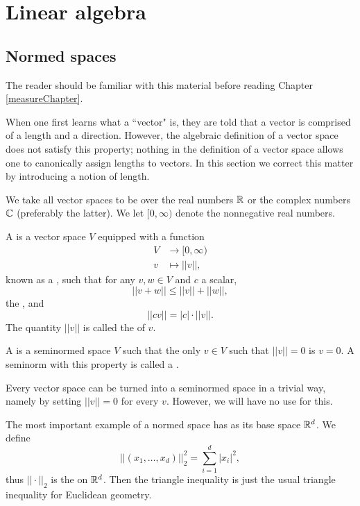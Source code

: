 \appendix
\chapter{Linear algebra}
\section{Normed spaces}
The reader should be familiar with this material before reading Chapter \ref{measureChapter}.

When one first learns what a ``vector" is, they are told that a vector is comprised of a length and a direction.
However, the algebraic definition of a vector space does not satisfy this property; nothing in the definition of a vector space allows one to canonically assign lengths to vectors.
In this section we correct this matter by introducing a notion of length.

We take all vector spaces to be over the real numbers $\mathbb{R}$ or the complex numbers $\mathbb{C}$ (preferably the latter).
We let $[0, \infty)$ denote the nonnegative real numbers.

\begin{definition}
A  is a vector space $V$ equipped with a function
\begin{align*}V &\to [0, \infty)\\
v &\mapsto ||v||,\end{align*}
known as a , such that for any $v, w \in V$ and $c$ a scalar,
$$||v + w|| \leq ||v|| + ||w||,$$
the , and
$$||cv|| = |c|\cdot||v||.$$
The quantity $||v||$ is called the  of $v$.

A  is a seminormed space $V$ such that the only $v \in V$ such that $||v|| = 0$ is $v = 0$.
A seminorm with this property is called a .
\end{definition}

\begin{example}
Every vector space can be turned into a seminormed space in a trivial way, namely by setting $||v|| = 0$ for every $v$.
However, we will have no use for this.
\end{example}

\begin{example}
The most important example of a normed space has as its base space $\mathbb{R}^d$.
We define
$$||(x_1, \dots, x_d)||_2^2 = \sum_{i=1}^d |x_i|^2,$$
thus $||\cdot||_2$ is the  on $\mathbb{R}^d$.
Then the triangle inequality is just the usual triangle inequality for Euclidean geometry.
\end{example}

